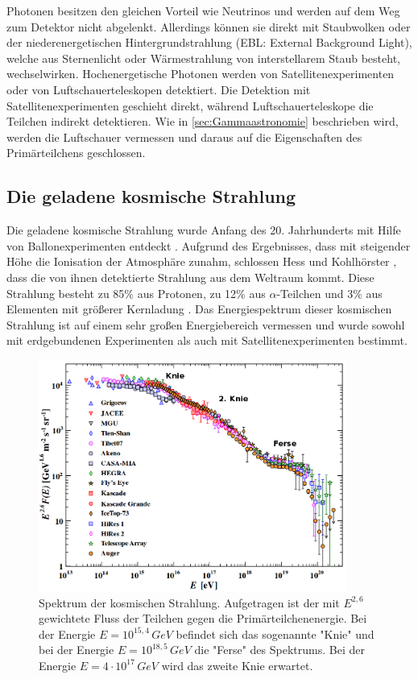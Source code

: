 Photonen besitzen den gleichen Vorteil wie Neutrinos und werden auf dem Weg zum Detektor nicht abgelenkt.
Allerdings können sie direkt mit Staubwolken oder der niederenergetischen Hintergrundstrahlung (EBL: External Background Light), welche aus Sternenlicht oder Wärmestrahlung von interstellarem Staub besteht, wechselwirken.
Hochenergetische Photonen werden von Satellitenexperimenten oder von Luftschauerteleskopen detektiert.
Die Detektion mit Satellitenexperimenten geschieht direkt, während Luftschauerteleskope die Teilchen indirekt detektieren.
Wie in \autoref{sec:Gammaastronomie} beschrieben wird, werden die Luftschauer vermessen und daraus auf die Eigenschaften des Primärteilchens geschlossen.


\subsection{Die geladene kosmische Strahlung}
Die geladene kosmische Strahlung wurde Anfang des 20. Jahrhunderts mit Hilfe von Ballonexperimenten entdeckt \cite{Hess}.
Aufgrund des Ergebnisses, dass mit steigender Höhe die Ionisation der Atmosphäre zunahm, schlossen Hess und Kohlhörster \cite{Kohlhoerster}, dass die von ihnen detektierte Strahlung aus dem Weltraum kommt.
Diese Strahlung besteht zu 85\% aus Protonen, zu 12\% aus $\alpha$-Teilchen und 3\% aus Elementen mit größerer Kernladung \cite{Grupen}.
Das Energiespektrum dieser kosmischen Strahlung ist auf einem sehr großen Energiebereich vermessen und wurde sowohl mit erdgebundenen Experimenten als auch mit Satellitenexperimenten bestimmt.


\begin{figure}
    \centering
    \includegraphics[width=0.9\textwidth]{./Plots/02_Astroteilchenphysik/CosmicRaySpectrum2.png}
    \caption{Spektrum der kosmischen Strahlung. 
      Aufgetragen ist der mit $E^{2,6}$ gewichtete Fluss der Teilchen gegen die Primärteilchenenergie. 
      Bei der Energie $E=10^{15,4}\,\si{GeV}$ befindet sich das sogenannte "Knie" und bei der Energie $E=10^{18,5}\,\si{GeV}$ die "Ferse" des Spektrums. 
      Bei der Energie $E=4\cdot 10^{17}\,\si{GeV}$ \cite{Knie} wird das zweite Knie erwartet.\cite{PDG}}
    \label{CR-Spektrum}
\end{figure}




